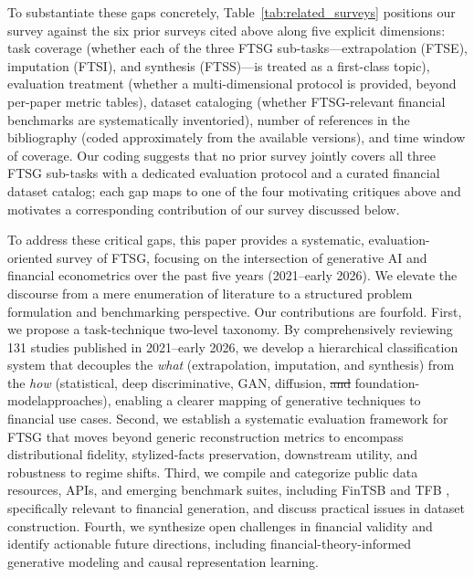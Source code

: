 \documentclass[11pt,a4paper]{article}
\makeatletter
\providecommand{\DIFaddtex}[1]{{\protect\color{blue}\uwave{#1}}} %
\providecommand{\DIFdeltex}[1]{{\protect\color{red}\sout{#1}}} %
\providecommand{\DIFaddbegin}{} %
\providecommand{\DIFaddend}{} %
\providecommand{\DIFdelbegin}{} %
\providecommand{\DIFdelend}{} %
\providecommand{\DIFadd}[1]{\texorpdfstring{\DIFaddtex{#1}}{#1}} %
\providecommand{\DIFdel}[1]{\texorpdfstring{\DIFdeltex{#1}}{}} %
\providecommand{\DIFscaledelfig}{0.5}
\newlength{\DIFdelgraphicswidth} %
\newlength{\DIFdelgraphicsheight} %
\providecommand{\DIFaddincludegraphics}[2][]{{\color{blue}\fbox{\DIFOincludegraphics[#1]{#2}}}} %
\providecommand{\DIFdelincludegraphics}[2][]{%
\sbox{\DIFdelgraphicsbox}{\DIFOincludegraphics[#1]{#2}}%
\settoboxwidth{\DIFdelgraphicswidth}{\DIFdelgraphicsbox} %
\settoboxtotalheight{\DIFdelgraphicsheight}{\DIFdelgraphicsbox} %
\scalebox{\DIFscaledelfig}{%
\parbox[b]{\DIFdelgraphicswidth}{\usebox{\DIFdelgraphicsbox}\\[-\baselineskip] \rule{\DIFdelgraphicswidth}{0em}}\llap{\resizebox{\DIFdelgraphicswidth}{\DIFdelgraphicsheight}{%
\setlength{\unitlength}{\DIFdelgraphicswidth}%
\begin{picture}(1,1)%
\thicklines\linethickness{2pt} %
{\color[rgb]{1,0,0}\put(0,0){\framebox(1,1){}}}%
{\color[rgb]{1,0,0}\put(0,0){\line( 1,1){1}}}%
{\color[rgb]{1,0,0}\put(0,1){\line(1,-1){1}}}%
\end{picture}%
}\hspace*{3pt}}} %
} %
\DeclareRobustCommand{\DIFaddbegin}{\DIFOaddbegin \let\includegraphics\DIFaddincludegraphics} %
\DeclareRobustCommand{\DIFaddend}{\DIFOaddend \let\includegraphics\DIFOincludegraphics} %
\DeclareRobustCommand{\DIFdelbegin}{\DIFOdelbegin \let\includegraphics\DIFdelincludegraphics} %
\DeclareRobustCommand{\DIFdelend}{\DIFOaddend \let\includegraphics\DIFOincludegraphics} %
\let\sout@orig\sout %
\renewcommand{\sout}[1]{\ifmmode\text{\sout@orig{\ensuremath{#1}}}\else\sout@orig{#1}\fi} %
\makeatother
\begin{document}
To substantiate these gaps concretely, Table~\ref{tab:related_surveys} positions our survey against the six prior surveys cited above along five explicit dimensions: task coverage (whether each of the three FTSG sub-tasks---extrapolation (FTSE), imputation (FTSI), and synthesis (FTSS)---is treated as a first-class topic), evaluation treatment (whether a multi-dimensional protocol is provided, beyond per-paper metric tables), dataset cataloging (whether FTSG-relevant financial benchmarks are systematically inventoried), number of references in the bibliography (coded approximately from the available versions), and time window of coverage. Our coding suggests that no prior survey jointly covers all three FTSG sub-tasks with a dedicated evaluation protocol and a curated financial dataset catalog; each gap maps to one of the four motivating critiques above and motivates a corresponding contribution of our survey discussed below.

To address these critical gaps, this paper provides a systematic, evaluation-oriented survey of FTSG, focusing on the intersection of generative AI and financial econometrics over the past five years (2021--early 2026). We elevate the discourse from a mere enumeration of literature to a structured problem formulation and benchmarking perspective. Our contributions are fourfold. First, we propose a task-technique two-level taxonomy. By comprehensively reviewing 131 studies published in 2021--early 2026, we develop a hierarchical classification system that decouples the \textit{what} (extrapolation, imputation, and synthesis) from the \textit{how} (statistical, deep discriminative, GAN, diffusion, \DIFdelbegin \DIFdel{and }\DIFdelend foundation-model\DIFaddbegin \DIFadd{, and controllable multimodal }\DIFaddend approaches), enabling a clearer mapping of generative techniques to financial use cases. Second, we establish a systematic evaluation framework for FTSG that moves beyond generic reconstruction metrics to encompass distributional fidelity, stylized-facts preservation, downstream utility, and robustness to regime shifts. Third, we compile and categorize public data resources, APIs, and emerging benchmark suites, including FinTSB \citep{hu2025fintsb} and TFB \citep{TFB}, specifically relevant to financial generation, and discuss practical issues in dataset construction. Fourth, we synthesize open challenges in financial validity and identify actionable future directions, including financial-theory-informed generative modeling and causal representation learning.
\end{document}
